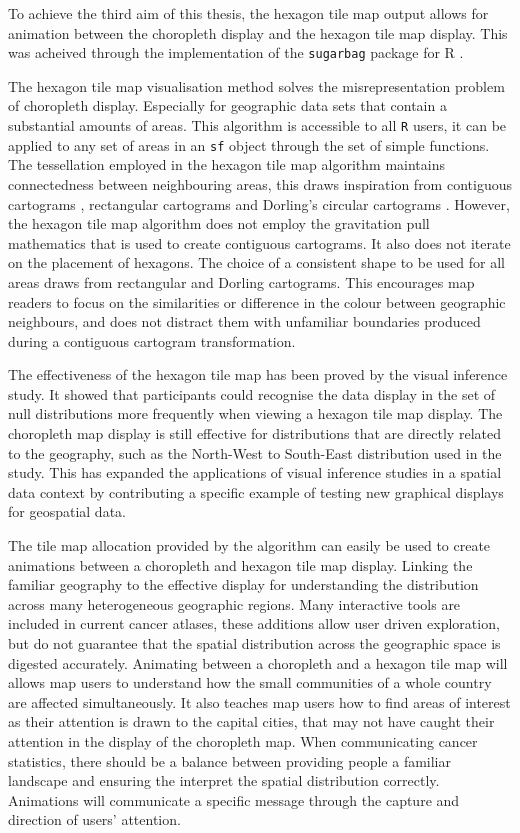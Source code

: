 \documentclass{monashthesis}
\begin{document}
To achieve the third aim of this thesis, the hexagon tile map output allows for animation between the choropleth display and the hexagon tile map display. This was acheived through the implementation of the \texttt{sugarbag} \autocite{sugarbag} package for R \autocite{R}.

The hexagon tile map visualisation method solves the misrepresentation problem of choropleth display. Especially for geographic data sets that contain a substantial amounts of areas. This algorithm is accessible to all \texttt{R} users, it can be applied to any set of areas in an \texttt{sf} \autocite{sf} object through the set of simple functions.
The tessellation employed in the hexagon tile map algorithm maintains connectedness between neighbouring areas, this draws inspiration from contiguous cartograms \autocite{ACA}, rectangular cartograms \autocite{RSCW} and Dorling's circular cartograms \autocite{ACTUC}. However, the hexagon tile map algorithm does not employ the gravitation pull mathematics that is used to create contiguous cartograms. It also does not iterate on the placement of hexagons. The choice of a consistent shape to be used for all areas draws from rectangular and Dorling cartograms. This encourages map readers to focus on the similarities or difference in the colour between geographic neighbours, and does not distract them with unfamiliar boundaries produced during a contiguous cartogram transformation.

The effectiveness of the hexagon tile map has been proved by the visual inference study. It showed that participants could recognise the data display in the set of null distributions more frequently when viewing a hexagon tile map display. The choropleth map display is still effective for distributions that are directly related to the geography, such as the North-West to South-East distribution used in the study. This has expanded the applications of visual inference studies in a spatial data context by contributing a specific example of testing new graphical displays for geospatial data.

The tile map allocation provided by the algorithm can easily be used to create animations between a choropleth and hexagon tile map display. Linking the familiar geography to the effective display for understanding the distribution across many heterogeneous geographic regions. Many interactive tools are included in current cancer atlases, these additions allow user driven exploration, but do not guarantee that the spatial distribution across the geographic space is digested accurately.
Animating between a choropleth and a hexagon tile map will allows map users to understand how the small communities of a whole country are affected simultaneously. It also teaches map users how to find areas of interest as their attention is drawn to the capital cities, that may not have caught their attention in the display of the choropleth map. When communicating cancer statistics, there should be a balance between providing people a familiar landscape and ensuring the interpret the spatial distribution correctly. Animations will communicate a specific message through the capture and direction of users' attention.
\end{document}
